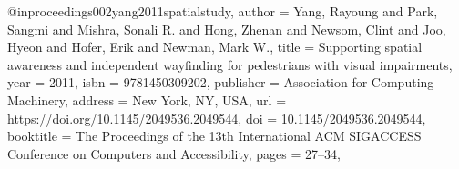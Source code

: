 @inproceedings{002yang2011spatialstudy,
author = {Yang, Rayoung and Park, Sangmi and Mishra, Sonali R. and Hong, Zhenan and Newsom, Clint and Joo, Hyeon and Hofer, Erik and Newman, Mark W.},
title = {Supporting spatial awareness and independent wayfinding for pedestrians with visual impairments},
year = {2011},
isbn = {9781450309202},
publisher = {Association for Computing Machinery},
address = {New York, NY, USA},
url = {https://doi.org/10.1145/2049536.2049544},
doi = {10.1145/2049536.2049544},
booktitle = {The Proceedings of the 13th International ACM SIGACCESS Conference on Computers and Accessibility},
pages = {27–34},
}
